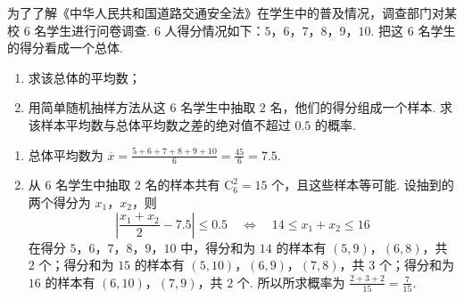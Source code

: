 \begin{problem}
为了了解《中华人民共和国道路交通安全法》在学生中的普及情况，调查部门对某校 \(6\) 名学生进行问卷调查. \(6\) 人得分情况如下：\(5\)，\(6\)，\(7\)，\(8\)，\(9\)，\(10\). 把这 \(6\) 名学生的得分看成一个总体.

\begin{enumerate}
\item 求该总体的平均数；
\item 用简单随机抽样方法从这 \(6\) 名学生中抽取 \(2\) 名，他们的得分组成一个样本. 求该样本平均数与总体平均数之差的绝对值不超过 \(0.5\) 的概率.
\end{enumerate}

\begin{solution}
\begin{enumerate}
\item 总体平均数为 \(\overline{x}=\frac{5+6+7+8+9+10}{6}=\frac{45}{6}=7.5\).

\item 从 \(6\) 名学生中抽取 \(2\) 名的样本共有 \(\mathrm C_6^2=15\) 个，且这些样本等可能. 设抽到的两个得分为 \(x_1\)，\(x_2\)，则
\[
\left|\frac{x_1+x_2}{2}-7.5\right|\leqslant0.5
\quad\Longleftrightarrow\quad
14\leqslant x_1+x_2\leqslant16
\]
在得分 \(5\)，\(6\)，\(7\)，\(8\)，\(9\)，\(10\) 中，得分和为 \(14\) 的样本有 \(\left(5,9\right)\)，\(\left(6,8\right)\)，共 \(2\) 个；得分和为 \(15\) 的样本有 \(\left(5,10\right)\)，\(\left(6,9\right)\)，\(\left(7,8\right)\)，共 \(3\) 个；得分和为 \(16\) 的样本有 \(\left(6,10\right)\)，\(\left(7,9\right)\)，共 \(2\) 个. 所以所求概率为 \(\frac{2+3+2}{15}=\frac{7}{15}\).
\end{enumerate}
\end{solution}
\end{problem}

